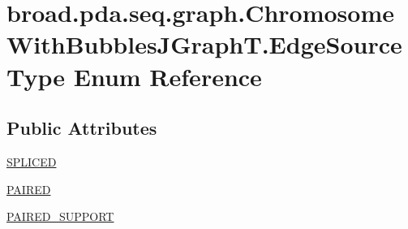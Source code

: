 \hypertarget{enumbroad_1_1pda_1_1seq_1_1graph_1_1_chromosome_with_bubbles_j_graph_t_1_1_edge_source_type}{\section{broad.\+pda.\+seq.\+graph.\+Chromosome\+With\+Bubbles\+J\+Graph\+T.\+Edge\+Source\+Type Enum Reference}
\label{enumbroad_1_1pda_1_1seq_1_1graph_1_1_chromosome_with_bubbles_j_graph_t_1_1_edge_source_type}
}
\subsection*{Public Attributes}
\begin{DoxyCompactItemize}
\item 
\hyperlink{enumbroad_1_1pda_1_1seq_1_1graph_1_1_chromosome_with_bubbles_j_graph_t_1_1_edge_source_type_a331268f2fdc2768b1af5eaf85088c81c}{S\+P\+L\+I\+C\+E\+D}
\item 
\hyperlink{enumbroad_1_1pda_1_1seq_1_1graph_1_1_chromosome_with_bubbles_j_graph_t_1_1_edge_source_type_abc309a31f783f3ad504b585f72077d44}{P\+A\+I\+R\+E\+D}
\item 
\hyperlink{enumbroad_1_1pda_1_1seq_1_1graph_1_1_chromosome_with_bubbles_j_graph_t_1_1_edge_source_type_a6b0c5a3035221bbb7c39819231858991}{P\+A\+I\+R\+E\+D\+\_\+\+S\+U\+P\+P\+O\+R\+T}
\end{DoxyCompactItemize}


